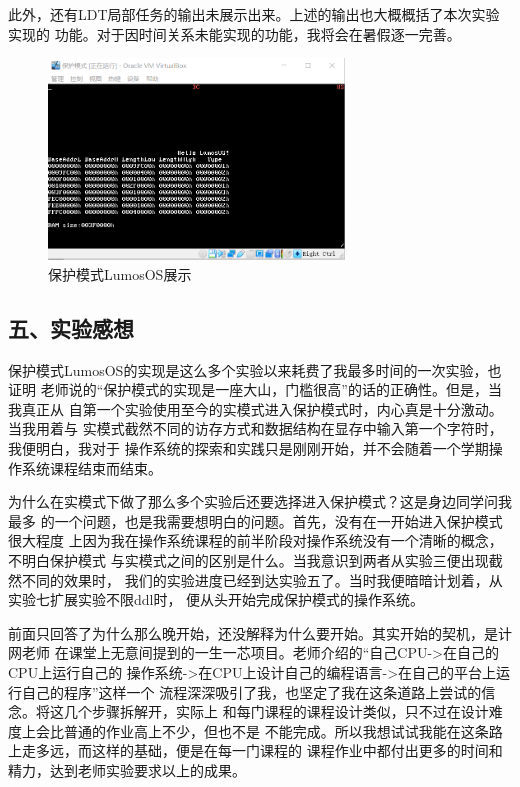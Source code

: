 \documentclass[12pt,a4paper,UTF8]{ctexart}
\begin{document}
此外，还有LDT局部任务的输出未展示出来。上述的输出也大概概括了本次实验实现的
功能。对于因时间关系未能实现的功能，我将会在暑假逐一完善。

\begin{figure}[htbp]
\centering
\includegraphics[width=0.7\textwidth]{figs/result.png}
\caption{保护模式LumosOS展示}
\label{fig:result}
\end{figure}

\subsection*{五、实验感想}

保护模式LumosOS的实现是这么多个实验以来耗费了我最多时间的一次实验，也证明
老师说的“保护模式的实现是一座大山，门槛很高”的话的正确性。但是，当我真正从
自第一个实验使用至今的实模式进入保护模式时，内心真是十分激动。当我用着与
实模式截然不同的访存方式和数据结构在显存中输入第一个字符时，我便明白，我对于
操作系统的探索和实践只是刚刚开始，并不会随着一个学期操作系统课程结束而结束。

为什么在实模式下做了那么多个实验后还要选择进入保护模式？这是身边同学问我最多
的一个问题，也是我需要想明白的问题。首先，没有在一开始进入保护模式很大程度
上因为我在操作系统课程的前半阶段对操作系统没有一个清晰的概念，不明白保护模式
与实模式之间的区别是什么。当我意识到两者从实验三便出现截然不同的效果时，
我们的实验进度已经到达实验五了。当时我便暗暗计划着，从实验七扩展实验不限ddl时，
便从头开始完成保护模式的操作系统。

前面只回答了为什么那么晚开始，还没解释为什么要开始。其实开始的契机，是计网老师
在课堂上无意间提到的一生一芯项目。老师介绍的“自己CPU->在自己的CPU上运行自己的
操作系统->在CPU上设计自己的编程语言->在自己的平台上运行自己的程序”这样一个
流程深深吸引了我，也坚定了我在这条道路上尝试的信念。将这几个步骤拆解开，实际上
和每门课程的课程设计类似，只不过在设计难度上会比普通的作业高上不少，但也不是
不能完成。所以我想试试我能在这条路上走多远，而这样的基础，便是在每一门课程的
课程作业中都付出更多的时间和精力，达到老师实验要求以上的成果。
\end{document}
